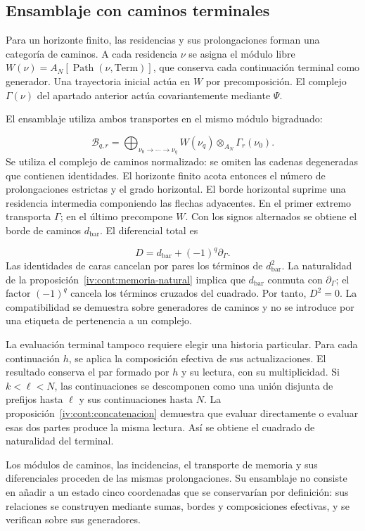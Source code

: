 \subsection{Ensamblaje con caminos terminales}
\label{iv:cont:ensamblaje}
Para un horizonte finito, las residencias y sus prolongaciones forman una categoría de caminos. A cada residencia \(\nu\) se asigna el módulo libre \(W(\nu)=A_N[\operatorname{Path}(\nu,\mathrm{Term})]\), que conserva cada continuación terminal como generador. Una trayectoria inicial actúa en \(W\) por precomposición. El complejo \(\Gamma(\nu)\) del apartado anterior actúa covariantemente mediante \(\Psi\).

El ensamblaje utiliza ambos transportes en el mismo módulo bigraduado:

\[
\mathcal B_{q,r}=
\bigoplus_{\nu_0\to\cdots\to\nu_q}
W(\nu_q)\otimes_{A_N}\Gamma_r(\nu_0).
\]
Se utiliza el complejo de caminos normalizado: se omiten las cadenas degeneradas que contienen identidades. El horizonte finito acota entonces el número de prolongaciones estrictas y el grado horizontal. El borde horizontal suprime una residencia intermedia componiendo las flechas adyacentes. En el primer extremo transporta \(\Gamma\); en el último precompone \(W\). Con los signos alternados se obtiene el borde de caminos \(d_{\mathrm{bar}}\). El diferencial total es

\[
D=d_{\mathrm{bar}}+(-1)^q\partial_\Gamma.
\]
Las identidades de caras cancelan por pares los términos de \(d_{\mathrm{bar}}^2\). La naturalidad de la proposición~\ref{iv:cont:memoria-natural} implica que \(d_{\mathrm{bar}}\) conmuta con \(\partial_\Gamma\); el factor \((-1)^q\) cancela los términos cruzados del cuadrado. Por tanto, \(D^2=0\). La compatibilidad se demuestra sobre generadores de caminos y no se introduce por una etiqueta de pertenencia a un complejo.

La evaluación terminal tampoco requiere elegir una historia particular. Para cada continuación \(h\), se aplica la composición efectiva de sus actualizaciones. El resultado conserva el par formado por \(h\) y su lectura, con su multiplicidad. Si \(k<\ell<N\), las continuaciones se descomponen como una unión disjunta de prefijos hasta \(\ell\) y sus continuaciones hasta \(N\). La proposición~\ref{iv:cont:concatenacion} demuestra que evaluar directamente o evaluar esas dos partes produce la misma lectura. Así se obtiene el cuadrado de naturalidad del terminal.

Los módulos de caminos, las incidencias, el transporte de memoria y sus diferenciales proceden de las mismas prolongaciones. Su ensamblaje no consiste en añadir a un estado cinco coordenadas que se conservarían por definición: sus relaciones se construyen mediante sumas, bordes y composiciones efectivas, y se verifican sobre sus generadores.

